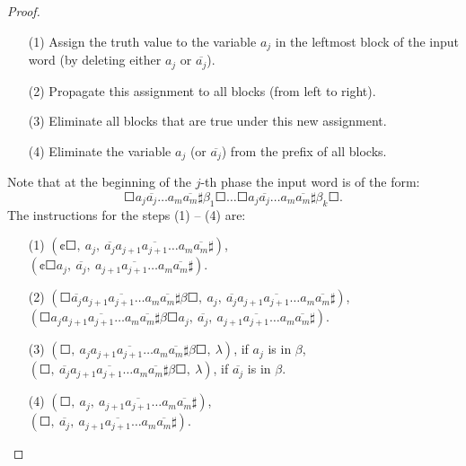 \begin{proof}
\begin{enumerate}
\item[(1)] Assign the truth value to the variable $a_j$ in the leftmost block of the input word (by deleting either $a_j$ or $\overline{a_j}$).
\item[(2)] Propagate this assignment to all blocks (from left to right).
\item[(3)] Eliminate all blocks that are true under this new assignment.
\item[(4)] Eliminate the variable $a_j$ (or $\overline{a_j}$) from the prefix of all blocks.
\end{enumerate}
Note that at the beginning of the $j$-th phase the input word is of the form:
$$\Square a_j \overline{a_j} \ldots a_m \overline{a_m} \sharp \beta_1 \Square \ldots \Square a_j \overline{a_j} \ldots a_m \overline{a_m} \sharp \beta_k \Square.$$
The instructions for the steps (1) -- (4) are:
\begin{enumerate}
\item[(1)] $(\cent \Square,\ a_j,\ \overline{a_j} a_{j+1} \overline{a_{j+1}} \ldots a_m \overline{a_m} \sharp)$,\\
$(\cent \Square a_j,\ \overline{a_j},\ a_{j+1} \overline{a_{j+1}} \ldots a_m \overline{a_m} \sharp)$.
\item[(2)] $(\Square \overline{a_j} a_{j+1} \overline{a_{j+1}} \ldots a_m \overline{a_m} \sharp \beta \Square,\ a_j,\ \overline{a_j} a_{j+1} \overline{a_{j+1}} \ldots a_m \overline{a_m} \sharp)$,\\
$(\Square a_j a_{j+1} \overline{a_{j+1}} \ldots a_m \overline{a_m} \sharp \beta \Square a_j,\ \overline{a_j},\ a_{j+1} \overline{a_{j+1}} \ldots a_m \overline{a_m} \sharp)$.
\item[(3)] $(\Square,\ a_j a_{j+1} \overline{a_{j+1}} \ldots a_m \overline{a_m} \sharp \beta \Square,\ \lambda)$, if $a_j$ is in $\beta$,\\
$(\Square,\ \overline{a_j} a_{j+1} \overline{a_{j+1}} \ldots a_m \overline{a_m} \sharp \beta \Square,\ \lambda)$, if $\overline{a_j}$ is in $\beta$.
\item[(4)] $(\Square,\ a_j,\ a_{j+1} \overline{a_{j+1}} \ldots a_m \overline{a_m} \sharp)$,\\
$(\Square,\ \overline{a_j},\ a_{j+1} \overline{a_{j+1}} \ldots a_m \overline{a_m} \sharp)$.
\end{enumerate}

\end{proof}
